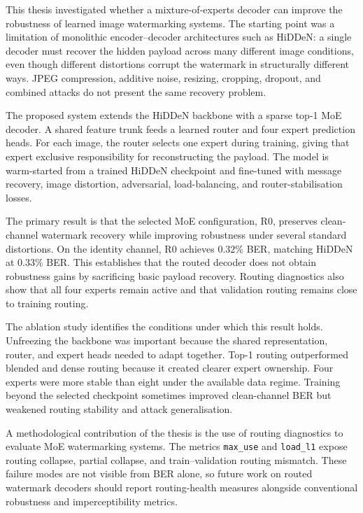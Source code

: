 ﻿\documentclass[12pt, a4paper, twoside]{report}
\numberwithin{equation}{chapter}
\begin{document}
This thesis investigated whether a mixture-of-experts decoder can improve the robustness of learned image watermarking systems. The starting point was a limitation of monolithic encoder--decoder architectures such as HiDDeN: a single decoder must recover the hidden payload across many different image conditions, even though different distortions corrupt the watermark in structurally different ways. JPEG compression, additive noise, resizing, cropping, dropout, and combined attacks do not present the same recovery problem.

The proposed system extends the HiDDeN backbone with a sparse top-1 MoE decoder. A shared feature trunk feeds a learned router and four expert prediction heads. For each image, the router selects one expert during training, giving that expert exclusive responsibility for reconstructing the payload. The model is warm-started from a trained HiDDeN checkpoint and fine-tuned with message recovery, image distortion, adversarial, load-balancing, and router-stabilisation losses.

The primary result is that the selected MoE configuration, R0, preserves clean-channel watermark recovery while improving robustness under several standard distortions. On the identity channel, R0 achieves $0.32\%$ BER, matching HiDDeN at $0.33\%$ BER. This establishes that the routed decoder does not obtain robustness gains by sacrificing basic payload recovery. Routing diagnostics also show that all four experts remain active and that validation routing remains close to training routing.

The ablation study identifies the conditions under which this result holds. Unfreezing the backbone was important because the shared representation, router, and expert heads needed to adapt together. Top-1 routing outperformed blended and dense routing because it created clearer expert ownership. Four experts were more stable than eight under the available data regime. Training beyond the selected checkpoint sometimes improved clean-channel BER but weakened routing stability and attack generalisation.

A methodological contribution of the thesis is the use of routing diagnostics to evaluate MoE watermarking systems. The metrics \texttt{max\_use} and \texttt{load\_l1} expose routing collapse, partial collapse, and train--validation routing mismatch. These failure modes are not visible from BER alone, so future work on routed watermark decoders should report routing-health measures alongside conventional robustness and imperceptibility metrics.
\end{document}
